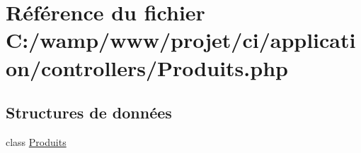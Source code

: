 \hypertarget{_produits_8php}{}\section{Référence du fichier C\+:/wamp/www/projet/ci/application/controllers/\+Produits.php}
\label{_produits_8php}
\subsection*{Structures de données}
\begin{DoxyCompactItemize}
\item 
class \mbox{\hyperlink{class_produits}{Produits}}
\end{DoxyCompactItemize}
